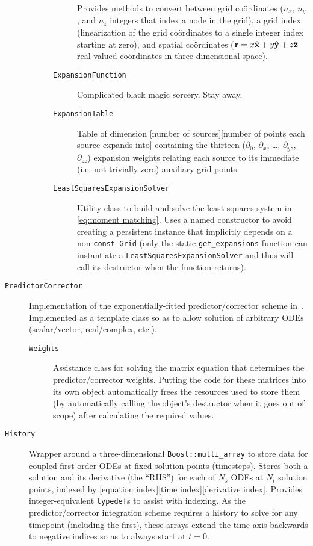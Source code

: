 \begin{description}
\begin{description}
\begin{description}
            Provides methods to convert between grid co\"ordinates ($n_x$, $n_y$, and $n_z$ integers that index a node in the grid), a grid index (linearization of the grid co\"ordinates to a single integer index starting at zero), and spatial co\"ordinates ($\vb{r} = x \vu{x} + y \vu{y} + z \vu{z}$ real-valued co\"ordinates in three-dimensional space).
          \item[\texttt{ExpansionFunction}] Complicated black magic sorcery. Stay away.
          \item[\texttt{ExpansionTable}] Table of dimension [number of sources][number of points each source expands into] containing the thirteen ($\partial_0$, $\partial_x$, \ldots, $\partial_{yz}$, $\partial_{zz}$) expansion weights relating each source to its immediate (i.e. not trivially zero) auxiliary grid points.
          \item[\texttt{LeastSquaresExpansionSolver}] Utility class to build and solve the least-squares system in \cref{eq:moment matching}.
            Uses a named constructor to avoid creating a persistent instance that implicitly depends on a non-\lstinline!const Grid! (only the static \lstinline!get_expansions! function can instantiate a \lstinline!LeastSquaresExpansionSolver! and thus will call its destructor when the function returns).
        \end{description}
    \end{description}
  \item[\texttt{PredictorCorrector}] Implementation of the exponentially-fitted predictor/corrector scheme in~\cite{Glaser2009}.
    Implemented as a template class so as to allow solution of arbitrary ODEs (scalar/vector, real/complex, etc.).
    \begin{description}
      \item[\texttt{Weights}] Assistance class for solving the matrix equation that determines the predictor/corrector weights.
        Putting the code for these matrices into its own object automatically frees the resources used to store them (by automatically calling the object's destructor when it goes out of scope) after calculating the required values.
    \end{description}
  \item[\texttt{History}] Wrapper around a three-dimensional \lstinline!Boost::multi_array! to store data for coupled first-order ODEs at fixed solution points (timesteps).
    Stores both a solution and its derivative (the ``RHS'') for each of $N_s$ ODEs at $N_t$ solution points, indexed by [equation index][time index][derivative index].
    Provides integer-equivalent \lstinline!typedef!s to assist with indexing.
    As the predictor/corrector integration scheme requires a history to solve for any timepoint (including the first), these arrays extend the time axis backwards to negative indices so as to always start at $t = 0$.
\end{description}
